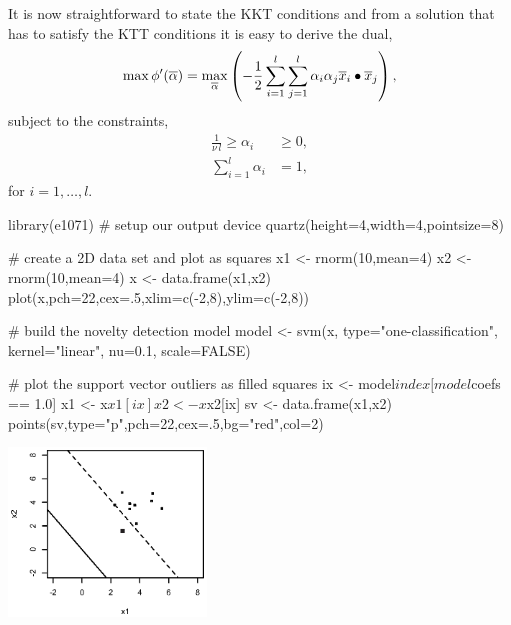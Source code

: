 \documentclass[a4paper,blends,pdf,colorBG,slideColor]{prosper}
\begin{document}
It is now straightforward to state the KKT conditions and from a solution that has to satisfy the
KTT conditions it is easy to derive the dual,
\begin{equation*}
\max \phi'(\overline{\alpha}) = \max_{\overline{\alpha}}\left ( - \frac{1}{2} \sum_{i=1}^l \sum_{j=1}^l \alpha_i \alpha_j \overline{x}_i\bullet\overline{x}_j \right ),
\end{equation*}
subject to the constraints,
\begin{align*}
\frac{1}{\nu\,l} \ge \alpha_i &\ge 0,\\
\sum_{i=1}^l \alpha_i & = 1,
\end{align*}
for $i = 1,\ldots,l$.

\es

\begin{Rcode}
library(e1071)
# setup our output device
quartz(height=4,width=4,pointsize=8)

# create a 2D data set and plot as squares
x1 <- rnorm(10,mean=4)
x2 <- rnorm(10,mean=4)
x <- data.frame(x1,x2)
plot(x,pch=22,cex=.5,xlim=c(-2,8),ylim=c(-2,8))

# build the novelty detection model
model <- svm(x,
             type="one-classification", 
             kernel="linear",
             nu=0.1,
             scale=FALSE)

# plot the support vector outliers as filled squares
ix <- model$index[model$coefs == 1.0]
x1 <- x$x1[ix]
x2 <- x$x2[ix]
sv <- data.frame(x1,x2)
points(sv,type="p",pch=22,cex=.5,bg="red",col=2)
\end{Rcode}
\es


\begin{center}
\includegraphics[height=45mm]{figures/fig13-03.eps}
\end{center}
\end{document}
